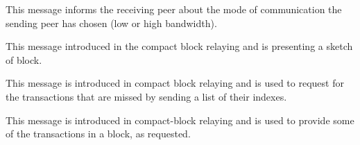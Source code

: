  This message informs the receiving peer about the mode of communication the sending peer has chosen (low or high bandwidth). %

 This message introduced in the compact block relaying and is presenting a sketch of block.

 This message is introduced in compact block relaying and is used to request for the transactions that are missed by sending a list of their indexes. 

 This message is introduced in compact-block relaying and is used to provide some of the transactions in a block, as requested.

